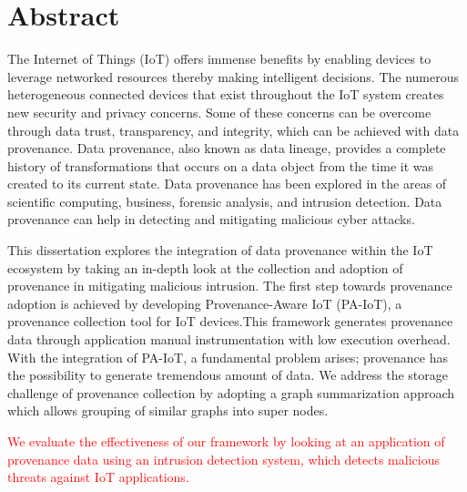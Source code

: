 

\chapter*{Abstract}
The Internet of Things (IoT) offers immense benefits by
enabling devices to leverage networked resources thereby making intelligent
decisions. The numerous heterogeneous connected devices that exist throughout
the IoT system creates new security and privacy concerns. Some of these concerns can
be overcome through data trust, transparency, and integrity, which can be
achieved with data provenance. Data provenance, also known as data lineage, provides a complete history of transformations that occurs on a data object from the time it was created to its current state. Data provenance has been explored in the areas of scientific computing, business, forensic analysis, and intrusion detection. Data provenance can help in detecting and mitigating malicious cyber attacks. 


 \par This dissertation explores the integration of data provenance within the IoT ecosystem by taking an in-depth look at the collection and adoption of provenance in mitigating malicious intrusion. The first step towards provenance adoption is achieved by developing Provenance-Aware IoT (PA-IoT), a provenance collection tool for IoT devices.This framework generates provenance data through application manual instrumentation with low execution overhead. With the integration of PA-IoT, a fundamental problem arises; provenance has the possibility to generate tremendous amount of data. We address the storage challenge of provenance collection by adopting a graph summarization approach which allows grouping of similar graphs into super nodes. 




\textcolor{red}{We evaluate the effectiveness of our framework by looking at an application of provenance data using an intrusion detection system, which detects malicious threats against IoT applications.}


